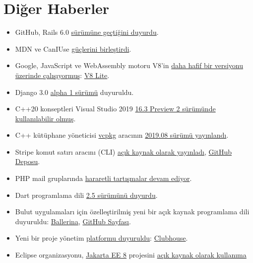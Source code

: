 \documentclass[11pt]{article}
\begin{document}
\section{Diğer Haberler}
\label{sec:org26263bd}
\begin{itemize}
\item GitHub, Rails 6.0 \href{https://github.blog/2019-09-09-running-github-on-rails-6-0/}{sürümüne geçtiğini duyurdu}.
\item MDN ve CanIUse \href{https://hacks.mozilla.org/2019/09/caniuse-and-mdn-compat-data-collaboration/}{güçlerini birleştirdi}.
\item Google, JavaScript ve WebAssembly motoru V8'in \href{https://v8.dev/blog/v8-lite}{daha hafif bir versiyonu
üzerinde çalışıyormuş}: \href{https://docs.google.com/document/d/10qh2-b4C5OtSg-xLwyZpEI5ZihVBPtn1xwKBbQC26yI/edit}{V8 Lite}.
\item Django 3.0 \href{https://www.djangoproject.com/weblog/2019/sep/10/django-30-alpha-1-released/}{alpha 1 sürümü} duyuruldu.
\item C++20 konseptleri Visual Studio 2019 \href{https://devblogs.microsoft.com/cppblog/c20-concepts-are-here-in-visual-studio-2019-version-16-3/}{16.3 Preview 2 sürümünde kullanılabilir
olmuş}.
\item C++ kütüphane yöneticisi \href{https://github.com/microsoft/vcpkg}{vcpkg} aracının \href{https://github.com/microsoft/vcpkg/releases/tag/2019.08}{2019.08 sürümü yayınlandı}.
\item Stripe komut satırı aracını (CLI) \href{https://twitter.com/stripe/status/1171474829570035712}{açık kaynak olarak yayınladı}, \href{https://github.com/stripe/stripe-cli}{GitHub
Deposu}.
\item PHP mail gruplarında \href{https://externals.io/message/106963}{hararetli tartışmalar devam ediyor}.
\item Dart programlama dili \href{https://medium.com/dartlang/announcing-dart-2-5-super-charged-development-328822024970}{2.5 sürümünü duyurdu}.
\item Bulut uygulamaları için özelleştirilmiş yeni bir açık kaynak programlama
dili duyuruldu: \href{https://v1-0.ballerina.io/}{Ballerina}, \href{https://github.com/ballerina-platform}{GitHub Sayfası}.
\item Yeni bir proje yönetim \href{https://techcrunch.com/2019/09/10/clubhouse-announces-new-collaboration-tool-and-free-version-of-its-project-management-platform/}{platformu duyuruldu}: \href{https://clubhouse.io/}{Clubhouse}.
\item Eclipse organizasyonu, \href{https://jakarta.ee/}{Jakarta EE 8} projesini \href{https://www.zdnet.com/article/java-finally-goes-all-in-on-open-source-with-the-release-of-jakarta-ee-8/}{açık kaynak olarak kullanıma
}
\end{itemize}
\end{document}
